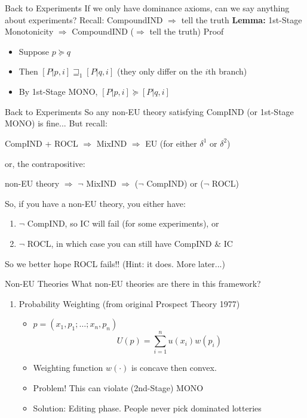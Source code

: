 \begin{frame}{Back to Experiments}
If we only have dominance axioms, can we say anything about experiments?
\br
Recall: CompoundIND $\Rightarrow$ tell the truth
\br
\textbf{Lemma:} 1st-Stage Monotonicity $\Rightarrow$ CompoundIND ($\Rightarrow$ tell the truth)
\br
Proof
\begin{itemize}
    \item Suppose $p\succeq q$
    \item Then $[P|p,i] \sqsupseteq_1 [P|q,i]$ (they only differ on the $i$th branch)
    \item By 1st-Stage MONO, $[P|p,i]\succeq [P|q,i]$
\end{itemize}
\end{frame}

\begin{frame}{Back to Experiments}
So any non-EU theory satisfying CompIND (or 1st-Stage MONO) is fine...
\br
But recall:\\
\begin{center}
    CompIND + ROCL $\Rightarrow$ MixIND $\Rightarrow$ EU (for either $\delta^1$ or $\delta^2$)
\end{center}
or, the contrapositive:
\begin{center}
    non-EU theory $\Rightarrow$ $\neg$ MixIND $\Rightarrow$ ($\neg$ CompIND) or ($\neg$ ROCL)
\end{center}
\br
So, if you have a non-EU theory, you either have:
\begin{enumerate}
    \item $\neg$ CompIND, so IC will fail (for some experiments), or
    \item $\neg$ ROCL, in which case you can still have CompIND \& IC
\end{enumerate}
So we better hope ROCL fails!! (Hint: it does. More later...)
\end{frame}


\begin{frame}{Non-EU Theories}
What non-EU theories are there in this framework?
\begin{enumerate}
    \item Probability Weighting (from original Prospect Theory 1977)
    \begin{itemize}
        \item $p=(x_1,p_1;\ldots;x_n,p_n)$
        $$
            U(p) = \sum_{i=1}^n u(x_i) w(p_i)
        $$
        \item Weighting function $w(\cdot)$ is concave then convex.
        \item Problem! This can violate (2nd-Stage) MONO
        \item Solution: Editing phase. People never pick dominated lotteries
    \end{itemize}
    \seti
\end{enumerate}
\end{frame}

